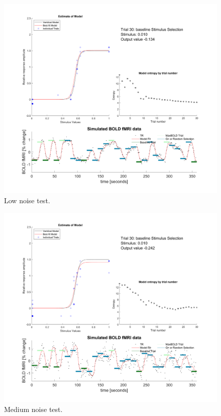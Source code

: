 \documentclass[
  english,
  man,floatsintext]{apa6}
\begin{document}
\begin{figure}
  
  {\centering \includegraphics[width=500px]{../results/figs/figLowSimulation} 
  
  }
  
  \caption{Low noise test.
\newpage}\label{fig:results-figure-lownoise}
  \end{figure}




\newpage

\begin{figure}
  
  {\centering \includegraphics[width=500px]{../results/figs/figMedSimulation} 
  
  }
  
  \caption{Medium noise test.
\newpage}\label{fig:results-figure-mednoise}
  \end{figure}
\end{document}
